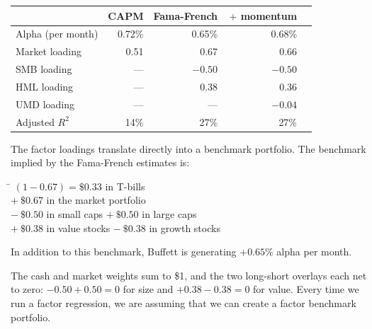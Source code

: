 \renewcommand{\arraystretch}{1.25}
\noindent\begin{tabularx}{\textwidth}{@{}p{4.2cm}rrrX@{}}
\toprule
& \textbf{\sffamily\small CAPM} & \textbf{\sffamily\small Fama-French} & \textbf{\sffamily\small \,$+$ momentum} & \\
\midrule
Alpha (per month) & 0.72\% & 0.65\% & 0.68\% & \\
Market loading & 0.51 & 0.67 & 0.66 & \\
SMB loading & --- & $-0.50$ & $-0.50$ & \\
HML loading & --- & 0.38 & 0.36 & \\
UMD loading & --- & --- & $-0.04$ & \\
Adjusted $R^2$ & 14\% & 27\% & 27\% & \\
\bottomrule
\end{tabularx}
\renewcommand{\arraystretch}{1}

The factor loadings translate directly into a benchmark portfolio. The benchmark
implied by the Fama-French estimates is:

\begin{imdefbox}[title={The mimicking portfolio, per \$1 of capital}]
\begin{tabbing}
\hspace{3.6cm}\=\kill
$(1-0.67) = \$0.33$ \> in T-bills \\
$+\ \$0.67$ \> in the market portfolio \\
$-\ \$0.50$ \> in small caps \qquad $+\ \$0.50$ in large caps \\
$+\ \$0.38$ \> in value stocks \qquad $-\ \$0.38$ in growth stocks
\end{tabbing}
\vspace{2pt}
In addition to this benchmark, Buffett is generating $+0.65\%$ alpha per month.
\end{imdefbox}

The cash and market weights sum to \$1, and the two long-short overlays each net
to zero: $-0.50 + 0.50 = 0$ for size and $+0.38 - 0.38 = 0$ for value.  Every time
we run a factor regression, we are assuming that we can create a factor benchmark
portfolio.

